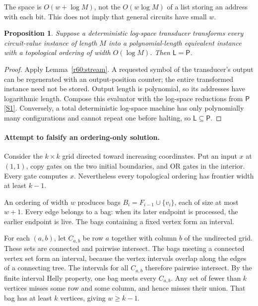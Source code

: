 \documentclass[11pt,a4paper]{article}
\newcommand{\sref}[2]{\hyperlink{source:#1:#2}{[S#2]}}
\newtheorem{notebookproposition}[notebooklemma]{Proposition}
\numberwithin{equation}{section}
\begin{document}
The space is $O(w+\log M)$, not the $O(w\log M)$ of a list storing an address with each bit. This does not imply that general circuits have small $w$.

\begin{notebookproposition}\label{r60:conditional}
Suppose a deterministic log-space transducer transforms every circuit-value instance of length $M$ into a polynomial-length equivalent instance with a topological ordering of width $O(\log M)$. Then $\mathsf L=\mathsf P$.
\end{notebookproposition}
\begin{proof}
Apply Lemma~\ref{r60:stream}. A requested symbol of the transducer's output can be regenerated with an output-position counter; the entire transformed instance need not be stored. Output length is polynomial, so its addresses have logarithmic length. Compose this evaluator with the log-space reductions from $\mathsf P$ \sref{statement}{1}. Conversely, a total deterministic log-space machine has only polynomially many configurations and cannot repeat one before halting, so $\mathsf L\subseteq\mathsf P$.
\end{proof}

\paragraph{Attempt to falsify an ordering-only solution.}
Consider the $k\times k$ grid directed toward increasing coordinates. Put an input $x$ at $(1,1)$, copy gates on the two initial boundaries, and OR gates in the interior. Every gate computes $x$. Nevertheless every topological ordering has frontier width at least $k-1$.

An ordering of width $w$ produces bags $B_i=F_{i-1}\cup\{v_i\}$, each of size at most $w+1$. Every edge belongs to a bag: when its later endpoint is processed, the earlier endpoint is live. The bags containing a fixed vertex form an interval.

For each $(a,b)$, let $C_{a,b}$ be row $a$ together with column $b$ of the undirected grid. These sets are connected and pairwise intersect. The bags meeting a connected vertex set form an interval, because the vertex intervals overlap along the edges of a connecting tree. The intervals for all $C_{a,b}$ therefore pairwise intersect. By the finite interval Helly property, one bag meets every $C_{a,b}$. Any set of fewer than $k$ vertices misses some row and some column, and hence misses their union. That bag has at least $k$ vertices, giving $w\ge k-1$.
\end{document}

